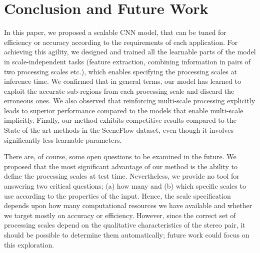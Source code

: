\documentclass[runningheads]{llncs}
\begin{document}
\section{Conclusion and Future Work}

In this paper, we proposed a scalable CNN model, that can be tuned for efficiency or accuracy according to the requirements of each application. For achieving this agility, we designed and trained all the learnable parts of the model in scale-independent tasks (feature extraction, combining information in pairs of two processing scales etc.), which enables specifying the processing scales at inference time. We confirmed that in general terms, our model has learned to exploit the accurate sub-regions from each processing scale and discard the erroneous ones. We also observed that reinforcing multi-scale processing explicitly leads to superior performance compared to the models that enable multi-scale implicitly. Finally, our method exhibits competitive results compared to the State-of-the-art methods in the SceneFlow dataset, even though it involves significantly less learnable parameters.

There are, of course, some open questions to be examined in the future. We proposed that the most significant advantage of our method is the ability to define the processing scales at test time.  Nevertheless, we provide no tool for answering two critical questions; (a) how many and (b) which specific scales to use according to the properties of the input. Hence, the scale specification depends upon how many computational resources we have available and whether we target mostly on accuracy or efficiency. However, since the correct set of processing scales depend on the qualitative characteristics of the stereo pair, it should be possible to determine them automatically; future work could focus on this exploration.

\clearpage


\end{document}
